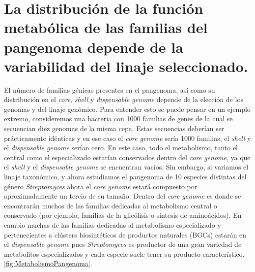 \documentclass[12pt,twoside]{reedthesis}
\begin{document}
  \section{La distribución de la función metabólica de las familias del
  pangenoma depende de la variabilidad del linaje
  seleccionado.}\label{la-distribucion-de-la-funcion-metabolica-de-las-familias-del-pangenoma-depende-de-la-variabilidad-del-linaje-seleccionado.}
  
  El número de familias génicas presentes en el pangenoma, así como su
  distribución en el \emph{core}, \emph{shell} y \emph{dispensable genome}
  depende de la elección de los genomas y del linaje genómico. Para
  entender esto se puede pensar en un ejemplo extremo, consideremos una
  bacteria con 1000 familias de genes de la cual se secuencian diez
  genomas de la misma cepa. Estas secuencias deberían ser prácticamente
  idénticas y en ese caso el \emph{core genome} sería 1000 familias, el
  \emph{shell} y el \emph{dispensable genome} serían cero. En este caso,
  todo el metabolismo, tanto el central como el especializado estarían
  conservados dentro del \emph{core genome}, ya que el \emph{shell} y el
  \emph{dispensable genome} se encuentran vacíos. Sin embargo, si variamos
  el linaje taxonómico, y ahora estudiamos el pangenoma de 10 especies
  distintas del género \emph{Streptomyces} ahora el \emph{core genome}
  estará compuesto por aproximadamente un tercio de su tamaño. Dentro del
  \emph{core genome} es donde se encontrarán muchos de las familias
  dedicadas al metabolismo central o conservado (por ejemplo, familias de
  la glicólisis o síntesis de aminoácidos). En cambio muchas de las
  familias dedicadas al metabolismo especializado y pertenecientes a
  clústers biosintéticos de productos naturales (BGCs) estarán en el
  \emph{dispensable genome} pues \emph{Streptomyces} es productor de una
  gran variedad de metabolitos especializados y cada especie suele tener
  su producto característico. \autoref{fig:MetabolismoPangenoma}.
  
\end{document}

